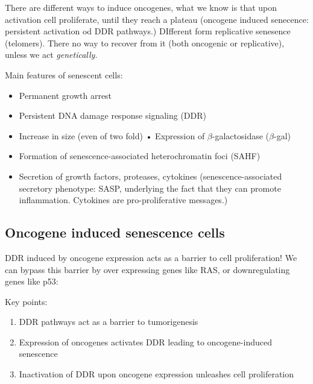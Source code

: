 There are different ways to induce oncogenes, what we know is that upon
activation cell proliferate, until they reach a plateau (oncogene
induced senecence: persistent activation od DDR pathways.) DIfferent
form replicative senesence (telomers). There no way to recover from it
(both oncogenic or replicative), unless we act \emph{genetically}.


Main features of senescent cells: 
\begin{itemize}
\tightlist
\item Permanent growth arrest 
\item Persistent DNA damage response signaling (DDR) 
\item Increase in size (even of two
fold) • Expression of $\beta$-galactosidase ($\beta$-gal) 
\item Formation of
senescence-associated heterochromatin foci (SAHF) 
\item Secretion of growth
factors, proteases, cytokines (senescence-associated secretory
phenotype: SASP, underlying the fact that they can promote inflammation.
Cytokines are pro-proliferative messages.)
\end{itemize}


\hypertarget{oncogene-induced-senescence-cells}{%
\subsection{Oncogene induced senescence
cells}\label{oncogene-induced-senescence-cells}}

DDR
induced by oncogene expression acts as a barrier to cell proliferation!
We can bypass this barrier by over expressing genes like RAS, or
downregulating genes like p53:


Key points: 
\begin{enumerate}
\tightlist
\item DDR pathways act as a barrier to tumorigenesis
\item Expression of oncogenes activates DDR leading to oncogene-induced
senescence
\item Inactivation of DDR upon oncogene expression unleashes
cell proliferation
\end{enumerate}

